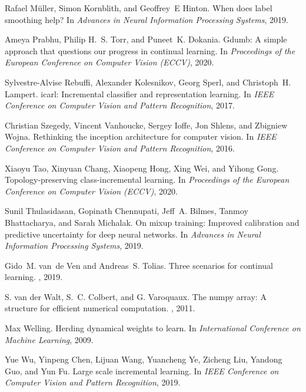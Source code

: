 \documentclass[final]{cvpr}
\begin{document}
\begin{thebibliography}{10}
Rafael M\"{u}ller, Simon Kornblith, and Geoffrey~E Hinton.
\newblock When does label smoothing help?
\newblock In {\em Advances in Neural Information Processing Systems}, 2019.

Ameya Prabhu, Philip H.~S. Torr, and Puneet~K. Dokania.
\newblock Gdumb: A simple approach that questions our progress in continual
  learning.
\newblock In {\em Proceedings of the European Conference on Computer Vision
  (ECCV)}, 2020.

Sylvestre-Alvise Rebuffi, Alexander Kolesnikov, Georg Sperl, and Christoph~H.
  Lampert.
\newblock icarl: Incremental classifier and representation learning.
\newblock In {\em IEEE Conference on Computer Vision and Pattern Recognition},
  2017.

Christian Szegedy, Vincent Vanhoucke, Sergey Ioffe, Jon Shlens, and Zbigniew
  Wojna.
\newblock Rethinking the inception architecture for computer vision.
\newblock In {\em IEEE Conference on Computer Vision and Pattern Recognition},
  2016.

Xiaoyu Tao, Xinyuan Chang, Xiaopeng Hong, Xing Wei, and Yihong Gong.
\newblock Topology-preserving class-incremental learning.
\newblock In {\em Proceedings of the European Conference on Computer Vision
  (ECCV)}, 2020.

Sunil Thulasidasan, Gopinath Chennupati, Jeff~A. Bilmes, Tanmoy Bhattacharya,
  and Sarah Michalak.
\newblock On mixup training: Improved calibration and predictive uncertainty
  for deep neural networks.
\newblock In {\em Advances in Neural Information Processing Systems}, 2019.

Gido~M. van~de Ven and Andreas~S. Tolias.
\newblock Three scenarios for continual learning.
, 2019.

S. {van der Walt}, S.~C. {Colbert}, and G. {Varoquaux}.
\newblock The numpy array: A structure for efficient numerical computation.
, 2011.

Max Welling.
\newblock Herding dynamical weights to learn.
\newblock In {\em International Conference on Machine Learning}, 2009.

Yue Wu, Yinpeng Chen, Lijuan Wang, Yuancheng Ye, Zicheng Liu, Yandong Guo, and
  Yun Fu.
\newblock Large scale incremental learning.
\newblock In {\em IEEE Conference on Computer Vision and Pattern Recognition},
  2019.


\end{thebibliography}
\end{document}
